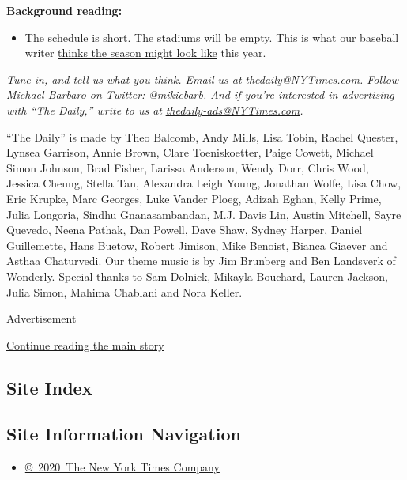 \textbf{Background reading:}

\begin{itemize}
\tightlist
\item
  The schedule is short. The stadiums will be empty. This is what our
  baseball writer
  \href{https://www.nytimes3xbfgragh.onion/2020/07/23/sports/baseball/mlb-season-coronavirus.html}{thinks
  the season might look like} this year.
\end{itemize}

\emph{Tune in, and tell us what you think. Email us at}
\href{mailto:thedaily@NYTimes.com}{\emph{thedaily@NYTimes.com}}\emph{.
Follow Michael Barbaro on Twitter:}
\href{https://twitter.com/mikiebarb}{\emph{@mikiebarb}}\emph{. And if
you're interested in advertising with ``The Daily,'' write to us at}
\href{mailto:thedaily-ads@NYTimes.com}{\emph{thedaily-ads@NYTimes.com}}\emph{.}

``The Daily'' is made by Theo Balcomb, Andy Mills, Lisa Tobin, Rachel
Quester, Lynsea Garrison, Annie Brown, Clare Toeniskoetter, Paige
Cowett, Michael Simon Johnson, Brad Fisher, Larissa Anderson, Wendy
Dorr, Chris Wood, Jessica Cheung, Stella Tan, Alexandra Leigh Young,
Jonathan Wolfe, Lisa Chow, Eric Krupke, Marc Georges, Luke Vander Ploeg,
Adizah Eghan, Kelly Prime, Julia Longoria, Sindhu Gnanasambandan, M.J.
Davis Lin, Austin Mitchell, Sayre Quevedo, Neena Pathak, Dan Powell,
Dave Shaw, Sydney Harper, Daniel Guillemette, Hans Buetow, Robert
Jimison, Mike Benoist, Bianca Giaever and Asthaa Chaturvedi. Our theme
music is by Jim Brunberg and Ben Landsverk of Wonderly. Special thanks
to Sam Dolnick, Mikayla Bouchard, Lauren Jackson, Julia Simon, Mahima
Chablani and Nora Keller.

Advertisement

\protect\hyperlink{after-bottom}{Continue reading the main story}

\hypertarget{site-index}{%
\subsection{Site Index}\label{site-index}}

\hypertarget{site-information-navigation}{%
\subsection{Site Information
Navigation}\label{site-information-navigation}}

\begin{itemize}
\tightlist
\item
  \href{https://help.nytimes3xbfgragh.onion/hc/en-us/articles/115014792127-Copyright-notice}{©~2020~The
  New York Times Company}
\end{itemize}

